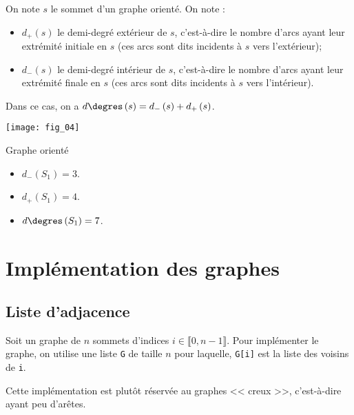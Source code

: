 \begin{defi}
On note $s$ le sommet d'un graphe orienté. On note : 
\begin{itemize}
\item $d_{+}\left(s\right)$ le demi-degré extérieur de $s$, c'est-à-dire le nombre d'arcs ayant leur extrémité initiale en $s$ (ces arcs sont dits incidents à $s$ vers l'extérieur);
\item $d_{-}\left(s\right)$ le demi-degré intérieur de $s$, c'est-à-dire le nombre d'arcs ayant leur extrémité finale en $s$ (ces arcs sont dits incidents à $s$ vers l'intérieur).
\end{itemize}

Dans ce cas, on a  $d\degres\left(s\right)=d_{-}\left(s\right)+d_{+}\left(s\right)$.
\end{defi}


\begin{marginfigure}
\texttt{[image: fig\_04]}
\caption{Graphe orienté \label{fig_04}}
\end{marginfigure}


\begin{exemple}
\begin{itemize}
\item $d_{-}\left(S_1\right)=3$.
\item $d_{+}\left(S_1\right)=4$.
\item $d\degres\left(S_1\right)=7$.
\end{itemize}
\end{exemple}



\section{Implémentation des graphes}

\subsection{Liste d'adjacence}
\begin{defi}
Soit un graphe de $n$ sommets d'indices $i \in \llbracket 0, n-1\rrbracket$. Pour implémenter le graphe, on utilise une liste \texttt{G} de taille $n$ pour laquelle, \texttt{G[i]} est la liste des voisins de \texttt{i}.
\end{defi}
\begin{rem}
Cette implémentation est plutôt réservée au graphes << creux >>, c'est-à-dire ayant peu d'arêtes.
\end{rem}

